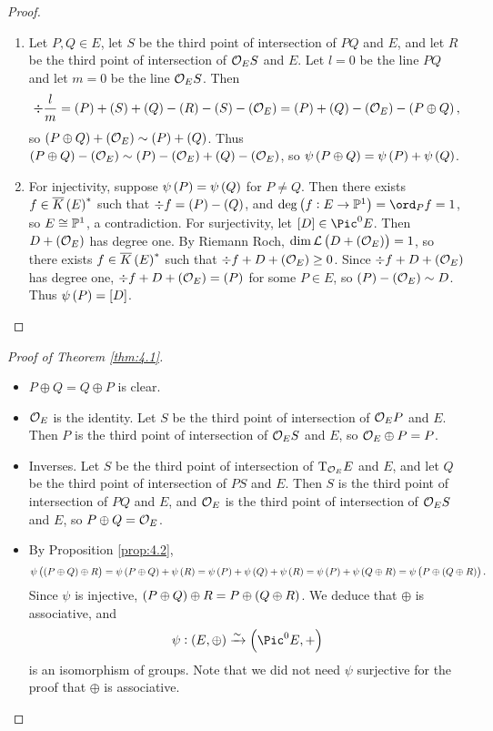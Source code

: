\begin{proof}
\hfill
\begin{enumerate}
\item Let $ P, Q \in E $, let $ S $ be the third point of intersection of $ PQ $ and $ E $, and let $ R $ be the third point of intersection of $ \mathcal{O}_ES $ and $ E $. Let $ l = 0 $ be the line $ PQ $ and let $ m = 0 $ be the line $ \mathcal{O}_ES $. Then
$$ \div \dfrac{l}{m} = \br{P} + \br{S} + \br{Q} - \br{R} - \br{S} - \br{\OOO_E} = \br{P} + \br{Q} - \br{\OOO_E} - \br{P \oplus Q}, $$
so $ \br{P \oplus Q} + \br{\OOO_E} \sim \br{P} + \br{Q} $. Thus $ \br{P \oplus Q} - \br{\OOO_E} \sim \br{P} - \br{\OOO_E} + \br{Q} - \br{\OOO_E} $, so $ \psi\br{P \oplus Q} = \psi\br{P} + \psi\br{Q} $.
\item For injectivity, suppose $ \psi\br{P} = \psi\br{Q} $ for $ P \ne Q $. Then there exists $ f \in \overline{K}\br{E}^* $ such that $ \div f = \br{P} - \br{Q} $, and $ \deg \br{f : E \to \PP^1} = \ord_P f = 1 $, so $ E \cong \mathbb{P}^1 $, a contradiction. For surjectivity, let $ \sbr{D} \in \Pic^0 E $. Then $ D + \br{\OOO_E} $ has degree one. By Riemann Roch, $ \dim \LLL\br{D + \br{\OOO_E}} = 1 $, so there exists $ f \in \overline{K}\br{E}^* $ such that $ \div f + D + \br{\OOO_E} \ge 0 $. Since $ \div f + D + \br{\OOO_E} $ has degree one, $ \div f + D + \br{\OOO_E} = \br{P} $ for some $ P \in E $, so $ \br{P} - \br{\OOO_E} \sim D $. Thus $ \psi\br{P} = \sbr{D} $.
\end{enumerate}
\end{proof}

\pagebreak

\begin{proof}[Proof of Theorem \ref{thm:4.1}]
\hfill
\begin{itemize}
\item $ P \oplus Q = Q \oplus P $ is clear.
\item $ \mathcal{O}_E $ is the identity. Let $ S $ be the third point of intersection of $ \mathcal{O}_EP $ and $ E $. Then $ P $ is the third point of intersection of $ \mathcal{O}_ES $ and $ E $, so $ \mathcal{O}_E \oplus P = P $.
\item Inverses. Let $ S $ be the third point of intersection of $ \mathrm{T}_{\mathcal{O}_E}E $ and $ E $, and let $ Q $ be the third point of intersection of $ PS $ and $ E $. Then $ S $ is the third point of intersection of $ PQ $ and $ E $, and $ \mathcal{O}_E $ is the third point of intersection of $ \mathcal{O}_ES $ and $ E $, so $ P \oplus Q = \mathcal{O}_E $.
\item By Proposition \ref{prop:4.2},
$$ \psi\br{\br{P \oplus Q} \oplus R} = \psi\br{P \oplus Q} + \psi\br{R} = \psi\br{P} + \psi\br{Q} + \psi\br{R} = \psi\br{P} + \psi\br{Q \oplus R} = \psi\br{P \oplus \br{Q \oplus R}}. $$
Since $ \psi $ is injective, $ \br{P \oplus Q} \oplus R = P \oplus \br{Q \oplus R} $. We deduce that $ \oplus $ is associative, and
$$ \psi : \br{E, \oplus} \xrightarrow{\sim} \br{\Pic^0 E, +} $$
is an isomorphism of groups. Note that we did not need $ \psi $ surjective for the proof that $ \oplus $ is associative.
\end{itemize}
\end{proof}

